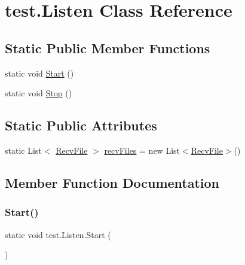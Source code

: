 \hypertarget{classtest_1_1_listen}{}\section{test.\+Listen Class Reference}
\label{classtest_1_1_listen}
\subsection*{Static Public Member Functions}
\begin{DoxyCompactItemize}
\item 
static void \hyperlink{classtest_1_1_listen_ab1bba494e70f3109691cbd58b2a2ed39}{Start} ()
\item 
static void \hyperlink{classtest_1_1_listen_a866e04429d0ca7626018a138a37c6f08}{Stop} ()
\end{DoxyCompactItemize}
\subsection*{Static Public Attributes}
\begin{DoxyCompactItemize}
\item 
static List$<$ \hyperlink{classtest_1_1_recv_file}{Recv\+File} $>$ \hyperlink{classtest_1_1_listen_ad800e778afc90df8e0c164bc68dfc7b4}{recv\+Files} = new List$<$\hyperlink{classtest_1_1_recv_file}{Recv\+File}$>$()
\end{DoxyCompactItemize}


\subsection{Member Function Documentation}
\mbox{\label{classtest_1_1_listen_ab1bba494e70f3109691cbd58b2a2ed39}} 
\subsubsection{\texorpdfstring{Start()}{Start()}}
{\footnotesize\ttfamily static void test.\+Listen.\+Start (\begin{DoxyParamCaption}{ }\end{DoxyParamCaption})\hspace{0.3cm}{\ttfamily [static]}}

\mbox{\label{classtest_1_1_listen_a866e04429d0ca7626018a138a37c6f08}} 
